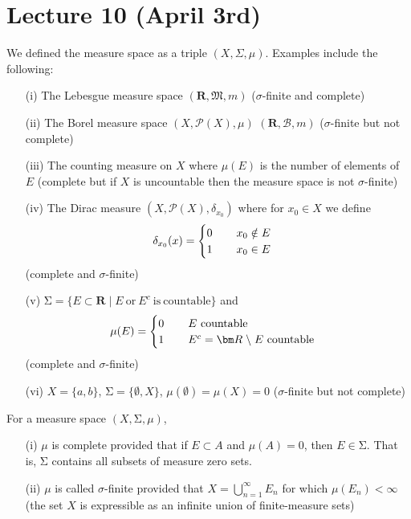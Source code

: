 \section{Lecture 10 (April 3rd)}
\begin{ex}
We defined the measure space as a triple $(X,\Sigma ,\mu )$. Examples include the following:
\begin{itemize}
\item[(i)] The Lebesgue measure space $({\bm R},\mathfrak{M},m)$ ($\sigma $-finite and complete)
\item[(ii)] The Borel measure space $(X,\mathcal{P}(X),\mu )$ $({\bm R},\mathcal{B},m)$ ($\sigma $-finite but not complete)
\item[(iii)] The counting measure on $X$ where $\mu (E)$ is the number of elements of $E$ (complete but if $X$ is uncountable then the measure space is not $\sigma $-finite)
\item[(iv)] The Dirac measure $(X,\mathcal{P}(X),\delta _{x_0})$ where for $x_0\in X$ we define
\[\delta _{x_0}(x)=
\begin{cases}
0\hspace{5ex}x_0\notin E\\
1\hspace{5ex}x_0\in E
\end{cases}
\] (complete and $\sigma $-finite)
\item[(v)] $\mathrm{\Sigma} =\{E\subset {\bm R} \;|\; E\mathrm{\ or \ }E^{c}\mathrm{\ is\ countable}\}$ and
\[\mu (E)=
\begin{cases}
0\hspace{5ex}E\mathrm{\ countable}\\
1\hspace{5ex}E^{c}={\bm R}\;\backslash\;E\mathrm{\ countable}
\end{cases}
\] (complete and $\sigma $-finite)
\item[(vi)] $X=\{a,b\}$, $\mathrm{\Sigma} =\{\emptyset,X\}$, $\mu (\emptyset)=\mu (X)=0$ ($\sigma $-finite but not complete)
\end{itemize}
\end{ex}
\vspace{2ex}
\begin{defi}
For a measure space $(X,\mathrm{\Sigma} ,\mu )$,
\begin{itemize}
\item[(i)] $\mu $ is complete provided that if $E\subset A$ and $\mu (A)=0$, then $E\in \mathrm{\Sigma} $. That is, $\mathrm{\Sigma} $ contains all subsets of measure zero sets. 
\item[(ii)] $\mu $ is called $\sigma $-finite provided that $X=\bigcup ^{\infty }_{n=1}E_{n}$ for which $\mu (E_{n})<\infty $ (the set $X$ is expressible as an infinite union of finite-measure sets)
\end{itemize}
\end{defi}
